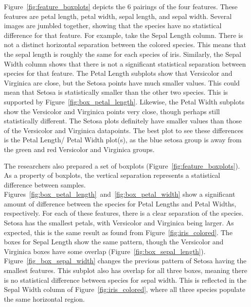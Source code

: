 \documentclass{article}
\begin{document}
Figure~\ref{fig:feature_boxplots} depicts the 6 pairings of the four features. These features are petal length, petal width, sepal length, and sepal width. Several images are jumbled together, showing that the species have no statistical difference for that feature. For example, take the Sepal Length column. There is not a distinct horizontal separation between the colored species. This means that the sepal length is roughly the same for each species of iris. Similarly, the Sepal Width column shows that there is not a significant statistical separation between species for that feature.
The Petal Length subplots show that Versicolor and Virginica are close, but the Setosa points have much smaller values. This could mean that Setosa is statistically smaller than the other two species. This is supported by Figure~\ref{fig:box_petal_length}. Likewise, the Petal Width subplots show the Versicolor and Virginica points very close, though perhaps still statistically different. The Setosa plots definitely have smaller values than those of the Versicolor and Virginica datapoints. The best plot to see these differences is the Petal Length/ Petal Width plot(s), as the blue setosa group is away from the green and red Versicolor and Virginica groups.

The researchers also prepared a set of boxplots (Figure~\ref{fig:feature_boxplots}). As a property of boxplots, the vertical separation represents a statistical difference between samples. Figures~\ref{fig:box_petal_length}~and~\ref{fig:box_petal_width} show a significant amount of difference between the species for Petal Lengths and Petal Widths, respectively. For each of these features, there is a clear separation of the species. Setosa has the smallest petals, with Versicolor and Virginica being larger. As expected, this is the same result as found from Figure~\ref{fig:iris_colored}. The boxes for Sepal Length show the same pattern, though the Versicolor and Virginica boxes have some overlap (Figure~\ref{fig:box_sepal_length}). Figure~\ref{fig_box_sepal_width} changes the previous pattern of Setosa having the smallest features. This subplot also has overlap for all three boxes, meaning there is no statistical difference between species for sepal width. This is reflected in the Sepal Width column of Figure~\ref{fig:iris_colored}, where all three species populate the same horizontal region.
\end{document}
